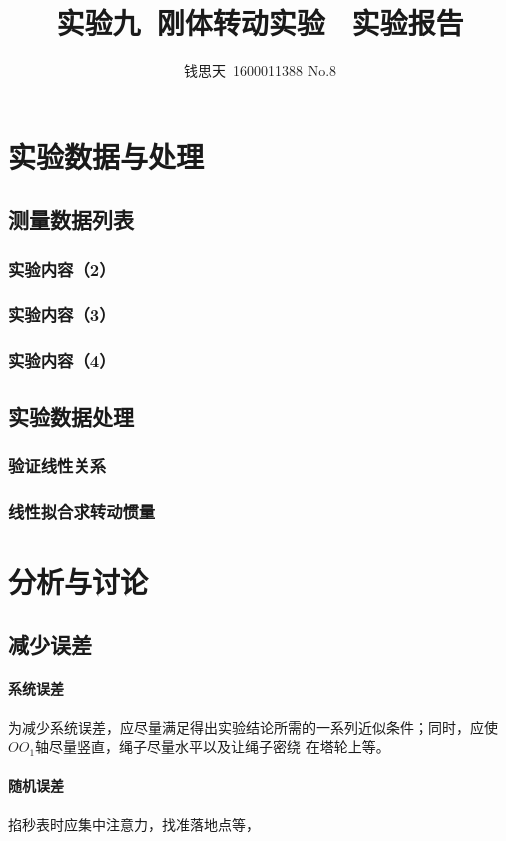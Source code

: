 \documentclass{ctexart}
\author{钱思天\ 1600011388 No.8}
\title{实验九\ 刚体转动实验 \ 实验报告}
\begin{document}
      \maketitle
      \section{实验数据与处理}
      \subsection{测量数据列表}
      \subsubsection{实验内容（2）}
      \subsubsection{实验内容（3）}
      \subsubsection{实验内容（4）}
      \subsection{实验数据处理}
      \subsubsection{验证线性关系}
      \subsubsection{线性拟合求转动惯量}
      \section{分析与讨论}
      \subsection{减少误差}
      \paragraph{系统误差}为减少系统误差，应尽量满足得出实验结论所需的一系列近似条件；同时，应使$OO_1$轴尽量竖直，绳子尽量水平以及让绳子密绕
      在塔轮上等。
      \paragraph{随机误差}掐秒表时应集中注意力，找准落地点等，
\end{document}
